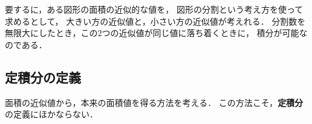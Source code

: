                 要するに，ある図形の面積の近似的な値を，
                図形の分割という考え方を使って求めるとして，
                大きい方の近似値と，小さい方の近似値が考えれる．
                分割数を無限大にしたとき，この2つの近似値が同じ値に落ち着くときに，
                積分が可能なのである．

            \subsection{定積分の定義}
                \begin{mycomment}
                    面積の近似値から，本来の面積値を得る方法を考える．
                    この方法こそ，\textbf{定積分} の定義にほかならない．
                \end{mycomment}

